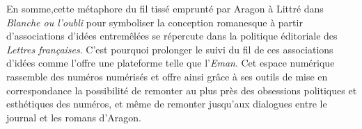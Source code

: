 En somme,cette métaphore du fil tissé emprunté par Aragon à Littré dans \emph{Blanche ou l'oubli} pour symboliser la conception romanesque à partir d'associations d'idées entremêlées se répercute dans la politique éditoriale des \emph{Lettres françaises}. C'est pourquoi prolonger le suivi du fil de ces associations d'idées comme l'offre une plateforme telle que l'\emph{Eman}. Cet espace numérique rassemble des numéros numérisés et offre ainsi grâce à ses outils de mise en correspondance la possibilité de remonter au plus près des obsessions politiques et esthétiques des numéros, et même de remonter jusqu'aux dialogues entre le journal et les romans d'Aragon. 